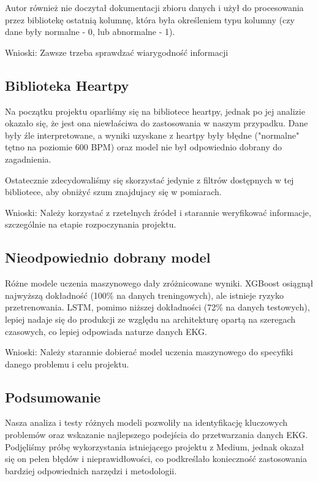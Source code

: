 \documentclass[12pt,a4paper]{article}
\begin{document}
Autor również nie doczytał dokumentacji zbioru danych i użył do procesowania przez bibliotekę ostatnią kolumnę, która była określeniem typu kolumny (czy dane były normalne - 0, lub abnormalne - 1).

Wnioski: Zawsze trzeba sprawdzać wiarygodność informacji

\subsection{Biblioteka Heartpy}
\label{sec:wnioski-heartpy}

Na początku projektu oparliśmy się na bibliotece heartpy, jednak po jej analizie okazało się, że jest ona niewłaściwa do zastosowania w naszym przypadku. Dane były źle interpretowane, a wyniki uzyskane z heartpy były błędne ("normalne"  tętno na poziomie 600 BPM) oraz model nie był odpowiednio dobrany do zagadnienia.

Ostatecznie zdecydowaliśmy się skorzystać jedynie z filtrów dostępnych w tej bibliotece, aby obniżyć szum znajdujacy się w pomiarach.

Wnioski: Należy korzystać z rzetelnych źródeł i starannie weryfikować informacje, szczególnie na etapie rozpoczynania projektu.

\subsection{Nieodpowiednio dobrany model}

Różne modele uczenia maszynowego dały zróżnicowane wyniki.
XGBoost osiągnął najwyższą dokładność (100\% na danych treningowych), ale istnieje ryzyko przetrenowania.
LSTM, pomimo niższej dokładności (72\% na danych testowych), lepiej nadaje się do produkcji ze względu na architekturę opartą na szeregach czasowych, co lepiej odpowiada naturze danych EKG.

Wnioski: Należy starannie dobierać model uczenia maszynowego do specyfiki danego problemu i celu projektu.

\subsection{Podsumowanie}
Nasza analiza i testy różnych modeli pozwoliły na identyfikację kluczowych problemów oraz wskazanie najlepszego podejścia do przetwarzania danych EKG. Podjęliśmy próbę wykorzystania istniejącego projektu z Medium, jednak okazał się on pełen błędów i nieprawidłowości, co podkreślało konieczność zastosowania bardziej odpowiednich narzędzi i metodologii.
\end{document}
